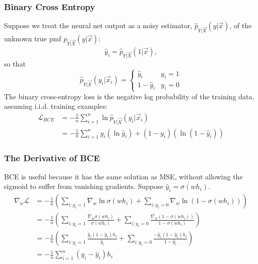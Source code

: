 \documentclass{beamer}
\begin{document}
\begin{frame}
  \frametitle{Binary Cross Entropy}

  Suppose we treat the neural net output as a noisy
  estimator, $\hat{p}_{Y|\vec{X}}(y|\vec{x})$, of the unknown true pmf
  $p_{Y|\vec{X}}\left(y|\vec{x}\right)$:
  \[
  \hat{y}_i = \hat{p}_{Y|\vec{X}}(1|\vec{x}),
  \]
  so that
  \begin{displaymath}
    \hat{p}_{Y|\vec{X}}(y_i|\vec{x}_i)
    =\begin{cases}\hat{y}_i & y_i=1\\1-\hat{y}_i & y_i=0\end{cases}
  \end{displaymath}
  The binary cross-entropy loss is the negative log probability of the
  training data, assuming i.i.d. training examples:
  \begin{align*}
    {\mathcal L}_{BCE} &= -\frac{1}{n}\sum_{i=1}^n \ln\hat{p}_{Y|\vec{X}}(y_i|\vec{x}_i)\\
    &= -\frac{1}{n}\sum_{i=1}^n
    y_i\left(\ln\hat{y}_i\right)+
    (1-y_i)\left(\ln(1-\hat{y}_i)\right)
  \end{align*}
\end{frame}

\begin{frame}
  \frametitle{The Derivative of BCE}

  BCE is useful because it has the same solution as MSE, without
  allowing the sigmoid to suffer from vanishing gradients.  Suppose
  $\hat{y}_i=\sigma(wh_i)$.
  \begin{align*}
    \nabla_w{\mathcal L}
    &=
    -\frac{1}{n}
    \left(
    \sum_{i:y_i=1}\nabla_w\ln\sigma(wh_i)
    +\sum_{i:y_i=0}\nabla_w\ln(1-\sigma(wh_i))
    \right)\\
    &=
    -\frac{1}{n}
    \left(
    \sum_{i:y_i=1}\frac{\nabla_w\sigma(wh_i)}{\sigma(wh_i)}
    +\sum_{i:y_i=0}\frac{\nabla_w(1-\sigma(wh_i))}{1-\sigma(wh_i)}
    \right)\\
    &=
    -\frac{1}{n}
    \left(
    \sum_{i:y_i=1}\frac{\hat{y}_i(1-\hat{y}_i)h_i}{\hat{y}_i}
    +\sum_{i:y_i=0}\frac{-\hat{y}_i(1-\hat{y}_i)h_i}{1-\hat{y}_i}
    \right)\\
    &=
    -\frac{1}{n}\sum_{i=1}^n
    \left(y_i-\hat{y}_i\right)h_i
  \end{align*}
\end{frame}
\end{document}
